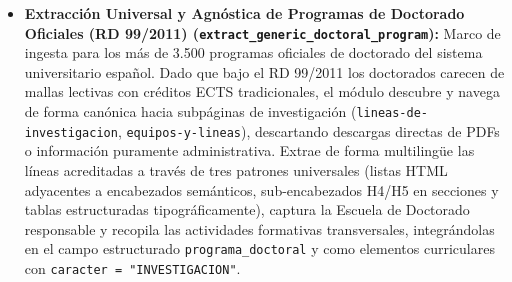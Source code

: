 \begin{itemize}
    \item \textbf{Extracción Universal y Agnóstica de Programas de Doctorado Oficiales (RD 99/2011) (\texttt{extract\_generic\_doctoral\_program}):} Marco de ingesta para los más de 3.500 programas oficiales de doctorado del sistema universitario español. Dado que bajo el RD 99/2011 los doctorados carecen de mallas lectivas con créditos ECTS tradicionales, el módulo descubre y navega de forma canónica hacia subpáginas de investigación (\texttt{lineas-de-investigacion}, \texttt{equipos-y-lineas}), descartando descargas directas de PDFs o información puramente administrativa. Extrae de forma multilingüe las líneas acreditadas a través de tres patrones universales (listas HTML adyacentes a encabezados semánticos, sub-encabezados H4/H5 en secciones y tablas estructuradas tipográficamente), captura la Escuela de Doctorado responsable y recopila las actividades formativas transversales, integrándolas en el campo estructurado \texttt{programa\_doctoral} y como elementos curriculares con \texttt{caracter = "INVESTIGACION"}.
\end{itemize}



